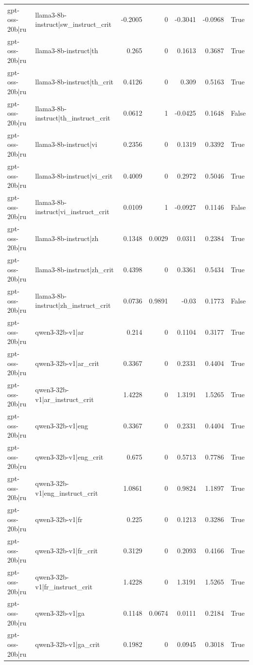 \begin{table}
\begin{tabular}{l l r r r r l}
gpt-oss-20b|ru & llama3-8b-instruct|sw_instruct_crit & -0.2005 & 0 & -0.3041 & -0.0968 & True \\
gpt-oss-20b|ru & llama3-8b-instruct|th & 0.265 & 0 & 0.1613 & 0.3687 & True \\
gpt-oss-20b|ru & llama3-8b-instruct|th_crit & 0.4126 & 0 & 0.309 & 0.5163 & True \\
gpt-oss-20b|ru & llama3-8b-instruct|th_instruct_crit & 0.0612 & 1 & -0.0425 & 0.1648 & False \\
gpt-oss-20b|ru & llama3-8b-instruct|vi & 0.2356 & 0 & 0.1319 & 0.3392 & True \\
gpt-oss-20b|ru & llama3-8b-instruct|vi_crit & 0.4009 & 0 & 0.2972 & 0.5046 & True \\
gpt-oss-20b|ru & llama3-8b-instruct|vi_instruct_crit & 0.0109 & 1 & -0.0927 & 0.1146 & False \\
gpt-oss-20b|ru & llama3-8b-instruct|zh & 0.1348 & 0.0029 & 0.0311 & 0.2384 & True \\
gpt-oss-20b|ru & llama3-8b-instruct|zh_crit & 0.4398 & 0 & 0.3361 & 0.5434 & True \\
gpt-oss-20b|ru & llama3-8b-instruct|zh_instruct_crit & 0.0736 & 0.9891 & -0.03 & 0.1773 & False \\
gpt-oss-20b|ru & qwen3-32b-v1|ar & 0.214 & 0 & 0.1104 & 0.3177 & True \\
gpt-oss-20b|ru & qwen3-32b-v1|ar_crit & 0.3367 & 0 & 0.2331 & 0.4404 & True \\
gpt-oss-20b|ru & qwen3-32b-v1|ar_instruct_crit & 1.4228 & 0 & 1.3191 & 1.5265 & True \\
gpt-oss-20b|ru & qwen3-32b-v1|eng & 0.3367 & 0 & 0.2331 & 0.4404 & True \\
gpt-oss-20b|ru & qwen3-32b-v1|eng_crit & 0.675 & 0 & 0.5713 & 0.7786 & True \\
gpt-oss-20b|ru & qwen3-32b-v1|eng_instruct_crit & 1.0861 & 0 & 0.9824 & 1.1897 & True \\
gpt-oss-20b|ru & qwen3-32b-v1|fr & 0.225 & 0 & 0.1213 & 0.3286 & True \\
gpt-oss-20b|ru & qwen3-32b-v1|fr_crit & 0.3129 & 0 & 0.2093 & 0.4166 & True \\
gpt-oss-20b|ru & qwen3-32b-v1|fr_instruct_crit & 1.4228 & 0 & 1.3191 & 1.5265 & True \\
gpt-oss-20b|ru & qwen3-32b-v1|ga & 0.1148 & 0.0674 & 0.0111 & 0.2184 & True \\
gpt-oss-20b|ru & qwen3-32b-v1|ga_crit & 0.1982 & 0 & 0.0945 & 0.3018 & True \\

\end{tabular}
\end{table}
